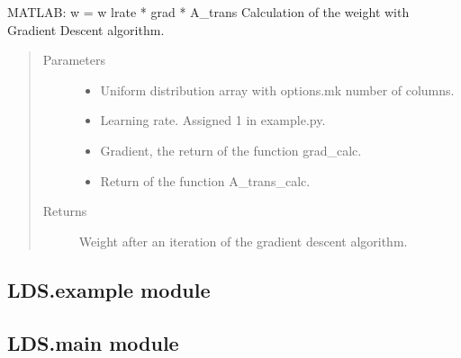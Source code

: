 \documentclass[letterpaper,10pt,english]{sphinxmanual}
\begin{document}
\begin{fulllineitems}
\label{\detokenize{LDS:LDS.OnlineLDS_library.w_calc_arima_ons}}
\sphinxAtStartPar
MATLAB: w = w \sphinxhyphen{} lrate * grad * A\_trans
Calculation of the weight with Gradient Descent algorithm.
\begin{quote}\begin{description}
\item[{Parameters}] \leavevmode\begin{itemize}
\item {} 
\sphinxAtStartPar
{} \textendash{} Uniform distribution array with options.mk number of columns.

\item {} 
\sphinxAtStartPar
{} \textendash{} Learning rate. Assigned 1 in example.py.

\item {} 
\sphinxAtStartPar
{} \textendash{} Gradient, the return of the function grad\_calc.

\item {} 
\sphinxAtStartPar
{} \textendash{} Return of the function A\_trans\_calc.

\end{itemize}

\item[{Returns}] \leavevmode
\sphinxAtStartPar
Weight after an iteration of the gradient descent algorithm.

\end{description}\end{quote}

\end{fulllineitems}



\subsection{LDS.example module}
\label{\detokenize{LDS:lds-example-module}}

\subsection{LDS.main module}
\label{\detokenize{LDS:module-LDS.main}}\label{\detokenize{LDS:lds-main-module}}
\end{document}
